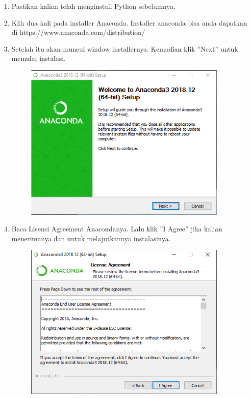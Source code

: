 \begin{enumerate}
	\item Pastikan kalian telah menginstall Python sebelumnya.
	\item Klik dua kali pada installer Anaconda. Installer anaconda bisa anda dapatkan di https://www.anaconda.com/distribution/
	\item Setelah itu akan muncul window installernya. Kemudian klik ''Next'' untuk memulai instalasi.
	\begin{figure}[H]
		\includegraphics[width=10cm]{figures/diva/1chp1diva.png}
		\centering
	\end{figure}

	\item Baca Lisensi Agreement Anacondanya. Lalu klik ''I Agree'' jika kalian menerimanya dan untuk melajutkannya instalasinya.
	\begin{figure}[H]
		\includegraphics[width=10cm]{figures/diva/2chp1diva.png}
		\centering
	\end{figure}


\end{enumerate}

